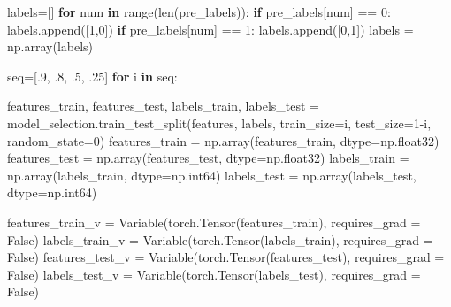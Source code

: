 \documentclass[11pt]{article}
\newenvironment{Shaded}{}{}
\newcommand{\KeywordTok}[1]{\textcolor[rgb]{0.00,0.44,0.13}{\textbf{{#1}}}}
\newcommand{\DecValTok}[1]{\textcolor[rgb]{0.25,0.63,0.44}{{#1}}}
\newcommand{\NormalTok}[1]{{#1}}
\newcommand{\VariableTok}[1]{\textcolor[rgb]{0.10,0.09,0.49}{{#1}}}
\newcommand{\ControlFlowTok}[1]{\textcolor[rgb]{0.00,0.44,0.13}{\textbf{{#1}}}}
\newcommand{\OperatorTok}[1]{\textcolor[rgb]{0.40,0.40,0.40}{{#1}}}
\newcommand{\BuiltInTok}[1]{{#1}}
\begin{document}
\begin{Shaded}
\begin{Highlighting}[]
\NormalTok{    labels}\OperatorTok{=}\NormalTok{[]}
    \ControlFlowTok{for}\NormalTok{ num }\KeywordTok{in} \BuiltInTok{range}\NormalTok{(}\BuiltInTok{len}\NormalTok{(pre_labels)):}
        \ControlFlowTok{if}\NormalTok{ pre_labels[num] }\OperatorTok{==} \DecValTok{0}\NormalTok{:}
\NormalTok{            labels.append([}\DecValTok{1}\NormalTok{,}\DecValTok{0}\NormalTok{])}
        \ControlFlowTok{if}\NormalTok{ pre_labels[num] }\OperatorTok{==} \DecValTok{1}\NormalTok{:}
\NormalTok{            labels.append([}\DecValTok{0}\NormalTok{,}\DecValTok{1}\NormalTok{])}
\NormalTok{    labels }\OperatorTok{=}\NormalTok{ np.array(labels)}
    
\NormalTok{    seq}\OperatorTok{=}\NormalTok{[.}\DecValTok{9}\NormalTok{, .}\DecValTok{8}\NormalTok{, .}\DecValTok{5}\NormalTok{, .}\DecValTok{25}\NormalTok{]}
    \ControlFlowTok{for}\NormalTok{ i }\KeywordTok{in}\NormalTok{ seq:}

\NormalTok{        features_train, features_test, labels_train, labels_test }\OperatorTok{=}\NormalTok{ model_selection.train_test_split(features, }
\NormalTok{                                                                                                    labels, train_size}\OperatorTok{=}\NormalTok{i,}
\NormalTok{                                                                                                    test_size}\OperatorTok{=}\DecValTok{1}\OperatorTok{-}\NormalTok{i,}
\NormalTok{                                                                                                    random_state}\OperatorTok{=}\DecValTok{0}\NormalTok{)}
\NormalTok{        features_train }\OperatorTok{=}\NormalTok{ np.array(features_train, dtype}\OperatorTok{=}\NormalTok{np.float32)}
\NormalTok{        features_test }\OperatorTok{=}\NormalTok{ np.array(features_test, dtype}\OperatorTok{=}\NormalTok{np.float32)}
\NormalTok{        labels_train }\OperatorTok{=}\NormalTok{ np.array(labels_train, dtype}\OperatorTok{=}\NormalTok{np.int64)}
\NormalTok{        labels_test }\OperatorTok{=}\NormalTok{ np.array(labels_test, dtype}\OperatorTok{=}\NormalTok{np.int64)}
        
\NormalTok{        features_train_v }\OperatorTok{=}\NormalTok{ Variable(torch.Tensor(features_train), requires_grad }\OperatorTok{=} \VariableTok{False}\NormalTok{)}
\NormalTok{        labels_train_v }\OperatorTok{=}\NormalTok{ Variable(torch.Tensor(labels_train), requires_grad }\OperatorTok{=} \VariableTok{False}\NormalTok{)}
\NormalTok{        features_test_v }\OperatorTok{=}\NormalTok{ Variable(torch.Tensor(features_test), requires_grad }\OperatorTok{=} \VariableTok{False}\NormalTok{)}
\NormalTok{        labels_test_v }\OperatorTok{=}\NormalTok{ Variable(torch.Tensor(labels_test), requires_grad }\OperatorTok{=} \VariableTok{False}\NormalTok{)}
         

\end{Highlighting}
\end{Shaded}
\end{document}
